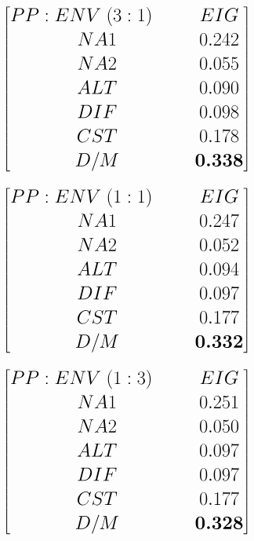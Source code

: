 \documentclass[aspectratio=1610,pdftex,dvipsnames,compress,xcolor={dvipsnames}]{beamer}
\begin{document}
\begin{frame}{}
    \begin{equation}
        \LARGE
        \begin{bmatrix}
            PP:ENV \; (3:1) \;\;\;\;\;\; &EIG \\ 
            NA1 &0.242 \\ 
            NA2 &0.055 \\ 
            ALT &0.090 \\ 
            DIF &0.098 \\ 
            CST &0.178 \\ 
            D/M &\textbf{0.338}
        \end{bmatrix} 
    \end{equation}
\end{frame}


\begin{frame}{}
    \begin{equation}
        \LARGE
        \begin{bmatrix}
            PP:ENV \; (1:1) \;\;\;\;\;\; &EIG \\ 
            NA1 &0.247 \\ 
            NA2 &0.052 \\ 
            ALT &0.094 \\ 
            DIF &0.097 \\ 
            CST &0.177 \\ 
            D/M &\textbf{0.332} 
        \end{bmatrix} 
    \end{equation}
\end{frame}


\begin{frame}{}
    \begin{equation}
        \LARGE
        \begin{bmatrix}
            PP:ENV \; (1:3) \;\;\;\;\;\; &EIG \\ 
            NA1 &0.251 \\ 
            NA2 &0.050 \\ 
            ALT &0.097 \\ 
            DIF &0.097 \\ 
            CST &0.177 \\ 
            D/M &\textbf{0.328}
        \end{bmatrix} 
    \end{equation}
\end{frame}
\end{document}
